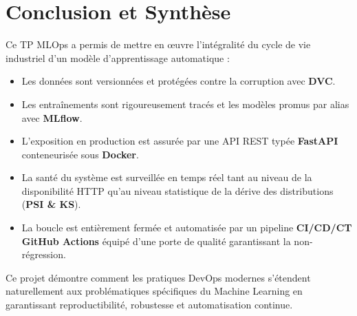 \documentclass[12pt,a4paper]{article}
\begin{document}
\newpage

\section{Conclusion et Synthèse}
Ce TP MLOps a permis de mettre en œuvre l'intégralité du cycle de vie industriel d'un modèle d'apprentissage automatique :
\begin{itemize}[leftmargin=*]
  \item Les données sont versionnées et protégées contre la corruption avec \textbf{DVC}.
  \item Les entraînements sont rigoureusement tracés et les modèles promus par alias avec \textbf{MLflow}.
  \item L'exposition en production est assurée par une API REST typée \textbf{FastAPI} conteneurisée sous \textbf{Docker}.
  \item La santé du système est surveillée en temps réel tant au niveau de la disponibilité HTTP qu'au niveau statistique de la dérive des distributions (\textbf{PSI \& KS}).
  \item La boucle est entièrement fermée et automatisée par un pipeline \textbf{CI/CD/CT GitHub Actions} équipé d'une porte de qualité garantissant la non-régression.
\end{itemize}

Ce projet démontre comment les pratiques DevOps modernes s'étendent naturellement aux problématiques spécifiques du Machine Learning en garantissant reproductibilité, robustesse et automatisation continue.
\end{document}
